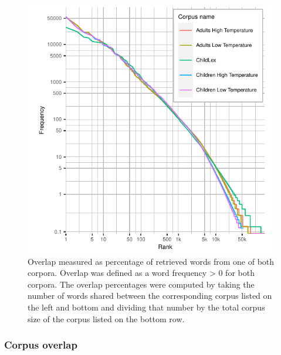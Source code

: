\documentclass[doc, a4paper]{apa7}
\begin{document}
\begin{figure}[!htbp]
  \centering
    \includegraphics[scale=.7]{figures/rankf1-exp2.pdf}
    \caption{Overlap measured as percentage of retrieved words from one of both corpora. Overlap was defined as a word frequency > 0 for both corpora. The overlap percentages were computed by taking the number of words shared between the corresponding corpus listed on the left and bottom and dividing that number by the total corpus size of the corpus listed on the bottom row.}
    \label{fig:rankplot-normal2}
\end{figure}

\clearpage


\subsubsection{Corpus overlap}
\end{document}
